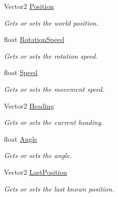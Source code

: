 \begin{DoxyCompactItemize}
\item 
Vector2 \hyperlink{class_m_b2_d_1_1_entity_component_1_1_movement_a7b94bcfe9d86cd611ef0c5b4afe6b426}{Position}
\begin{DoxyCompactList}\small\item\em Gets or sets the world position. \end{DoxyCompactList}\item 
float \hyperlink{class_m_b2_d_1_1_entity_component_1_1_movement_ae46e6d4afde985b6afe55b83ae1297a3}{Rotation\+Speed}
\begin{DoxyCompactList}\small\item\em Gets or sets the rotation speed. \end{DoxyCompactList}\item 
float \hyperlink{class_m_b2_d_1_1_entity_component_1_1_movement_aef220a1d502b303764058f3d11517bdf}{Speed}
\begin{DoxyCompactList}\small\item\em Gets or sets the movement speed. \end{DoxyCompactList}\item 
Vector2 \hyperlink{class_m_b2_d_1_1_entity_component_1_1_movement_adeedf6c11648bd487a6a7e75cc7848e3}{Heading}
\begin{DoxyCompactList}\small\item\em Gets or sets the current heading. \end{DoxyCompactList}\item 
float \hyperlink{class_m_b2_d_1_1_entity_component_1_1_movement_a289388b190b703874afecff7cd5ac450}{Angle}
\begin{DoxyCompactList}\small\item\em Gets or sets the angle. \end{DoxyCompactList}\item 
Vector2 \hyperlink{class_m_b2_d_1_1_entity_component_1_1_movement_aa9fc1e316492a6b72084d5c7f88786e7}{Last\+Position}
\begin{DoxyCompactList}\small\item\em Gets or sets the last known position. \end{DoxyCompactList}\end{DoxyCompactItemize}


